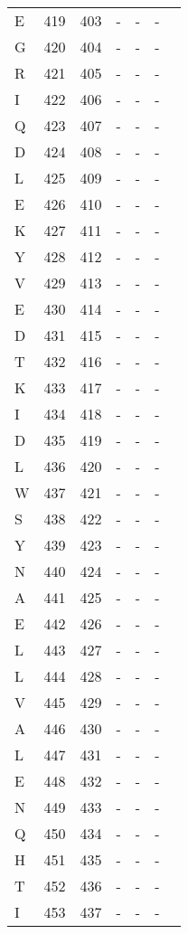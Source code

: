 \begin{longtable}{lllllll}
  E & 419 & 403 & - & - & - &  \\ 
  G & 420 & 404 & - & - & - &  \\ 
  R & 421 & 405 & - & - & - &  \\ 
  I & 422 & 406 & - & - & - &  \\ 
  Q & 423 & 407 & - & - & - &  \\ 
  D & 424 & 408 & - & - & - &  \\ 
  L & 425 & 409 & - & - & - &  \\ 
  E & 426 & 410 & - & - & - &  \\ 
  K & 427 & 411 & - & - & - &  \\ 
  Y & 428 & 412 & - & - & - &  \\ 
  V & 429 & 413 & - & - & - &  \\ 
  E & 430 & 414 & - & - & - &  \\ 
  D & 431 & 415 & - & - & - &  \\ 
  T & 432 & 416 & - & - & - &  \\ 
  K & 433 & 417 & - & - & - &  \\ 
  I & 434 & 418 & - & - & - &  \\ 
  D & 435 & 419 & - & - & - &  \\ 
  L & 436 & 420 & - & - & - &  \\ 
  W & 437 & 421 & - & - & - &  \\ 
  S & 438 & 422 & - & - & - &  \\ 
  Y & 439 & 423 & - & - & - &  \\ 
  N & 440 & 424 & - & - & - &  \\ 
  A & 441 & 425 & - & - & - &  \\ 
  E & 442 & 426 & - & - & - &  \\ 
  L & 443 & 427 & - & - & - &  \\ 
  L & 444 & 428 & - & - & - &  \\ 
  V & 445 & 429 & - & - & - &  \\ 
  A & 446 & 430 & - & - & - &  \\ 
  L & 447 & 431 & - & - & - &  \\ 
  E & 448 & 432 & - & - & - &  \\ 
  N & 449 & 433 & - & - & - &  \\ 
  Q & 450 & 434 & - & - & - &  \\ 
  H & 451 & 435 & - & - & - &  \\ 
  T & 452 & 436 & - & - & - &  \\ 
  I & 453 & 437 & - & - & - &  \\ 

\end{longtable}
